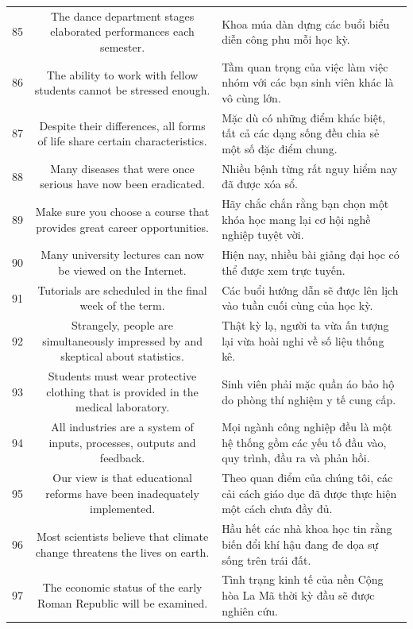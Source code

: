\documentclass[11pt,a4paper]{article}
\begin{document}
\begin{longtable}{N S M}
85 & The dance department stages elaborated performances each semester. & Khoa múa dàn dựng các buổi biểu diễn công phu mỗi học kỳ. \\
86 & The ability to work with fellow students cannot be stressed enough. & Tầm quan trọng của việc làm việc nhóm với các bạn sinh viên khác là vô cùng lớn. \\
87 & Despite their differences, all forms of life share certain characteristics. & Mặc dù có những điểm khác biệt, tất cả các dạng sống đều chia sẻ một số đặc điểm chung. \\
88 & Many diseases that were once serious have now been eradicated. & Nhiều bệnh từng rất nguy hiểm nay đã được xóa sổ. \\
89 & Make sure you choose a course that provides great career opportunities. & Hãy chắc chắn rằng bạn chọn một khóa học mang lại cơ hội nghề nghiệp tuyệt vời. \\
90 & Many university lectures can now be viewed on the Internet. & Hiện nay, nhiều bài giảng đại học có thể được xem trực tuyến. \\
91 & Tutorials are scheduled in the final week of the term. & Các buổi hướng dẫn sẽ được lên lịch vào tuần cuối cùng của học kỳ. \\
92 & Strangely, people are simultaneously impressed by and skeptical about statistics. & Thật kỳ lạ, người ta vừa ấn tượng lại vừa hoài nghi về số liệu thống kê. \\
93 & Students must wear protective clothing that is provided in the medical laboratory. & Sinh viên phải mặc quần áo bảo hộ do phòng thí nghiệm y tế cung cấp. \\
94 & All industries are a system of inputs, processes, outputs and feedback. & Mọi ngành công nghiệp đều là một hệ thống gồm các yếu tố đầu vào, quy trình, đầu ra và phản hồi. \\
95 & Our view is that educational reforms have been inadequately implemented. & Theo quan điểm của chúng tôi, các cải cách giáo dục đã được thực hiện một cách chưa đầy đủ. \\
96 & Most scientists believe that climate change threatens the lives on earth. & Hầu hết các nhà khoa học tin rằng biến đổi khí hậu đang đe dọa sự sống trên trái đất. \\
97 & The economic status of the early Roman Republic will be examined. & Tình trạng kinh tế của nền Cộng hòa La Mã thời kỳ đầu sẽ được nghiên cứu. \\

\end{longtable}
\end{document}
